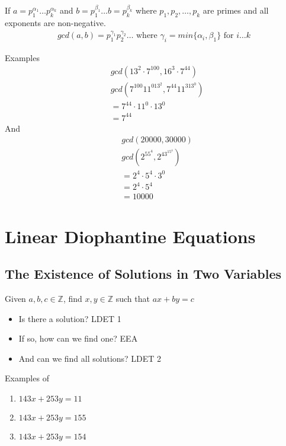 \documentclass{article}
\begin{document}
If $a = p_1^{\alpha_1} \ldots p_k^{\alpha_k}$ and $b=p_1^{\beta_1}\ldots b=p_k^{\beta_k}$ where $p_1,p_2,\ldots,p_k$ are primes and all exponents are non-negative.
\begin{align*}
 gcd(a,b) = p_1^{\gamma_1} p_2^{\gamma_2} \ldots \text{ where } \gamma_i = min\{\alpha_i, \beta_1\} \text{ for } i \ldots k   
\end{align*}

Examples
\begin{align*}
    &gcd(13^2 \cdot 7^{100}, 16^3 \cdot 7^{44}) \\
    &gcd(7^{100}11^013^2, 7^{44}11^313^0) \\
    &= 7^{44} \cdot 11^0 \cdot 13^0 \\
    &= 7^{44}
\end{align*}
And
\begin{align*}
    &gcd(20000,30000) \\
    &gcd(2^55^4,2^43^15^4) \\
    &= 2^4 \cdot 5^4 \cdot 3^0 \\
    &= 2^4 \cdot 5^4 \\
    &= 10000
\end{align*}


\section{Linear Diophantine Equations}

\subsection{The Existence of Solutions in Two Variables}

Given $a,b,c \in \mathbb{Z}$, find $x,y \in \mathbb{Z}$ such that $ax + by = c$

\begin{itemize}
    \item Is there a solution? LDET 1
    \item If so, how can we find one? EEA
    \item And can we find all solutions? LDET 2
\end{itemize}

Examples of 
\begin{enumerate}
    \item $143x + 253y = 11$
    \item $143x + 253y = 155$
    \item $143x + 253y = 154$
\end{enumerate}
\end{document}
